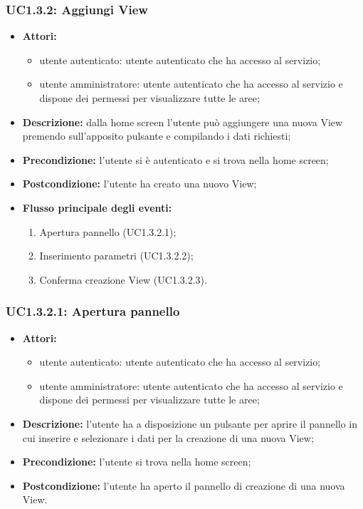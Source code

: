 \subsubsection{UC1.3.2: Aggiungi View}

\begin{itemize}
    \item \textbf{Attori:}
    \begin{itemize}
    	\item utente autenticato: utente autenticato che ha accesso al servizio;
    	\item utente amministratore: utente autenticato che ha accesso al servizio e dispone dei permessi per visualizzare tutte le aree;
	\end{itemize}
    \item \textbf{Descrizione:} dalla home screen l'utente può aggiungere una nuova View\gloss{} premendo sull'apposito pulsante e compilando i dati richiesti;
    \item \textbf{Precondizione:} l'utente si è autenticato e si trova nella home screen;
    \item \textbf{Postcondizione:} l'utente ha creato una nuovo View\gloss{};
	\item \textbf{Flusso principale degli eventi:}
    \begin{enumerate}
        \item Apertura pannello (UC1.3.2.1);
        \item Inserimento parametri (UC1.3.2.2);
        \item Conferma creazione View\gloss{} (UC1.3.2.3).
    \end{enumerate}
\end{itemize}

\subsubsection{UC1.3.2.1: Apertura pannello}

\begin{itemize}
    \item \textbf{Attori:}
    \begin{itemize}
    	\item utente autenticato: utente autenticato che ha accesso al servizio;
    	\item utente amministratore: utente autenticato che ha accesso al servizio e dispone dei permessi per visualizzare tutte le aree;
	\end{itemize}
    \item \textbf{Descrizione:} l'utente ha a disposizione un pulsante per aprire il pannello in cui inserire e selezionare i dati per la creazione di una nuova View\gloss{};
    \item \textbf{Precondizione:} l'utente si trova nella home screen;
    \item \textbf{Postcondizione:} l'utente ha aperto il pannello di creazione di una nuova View\gloss{}.
\end{itemize}

